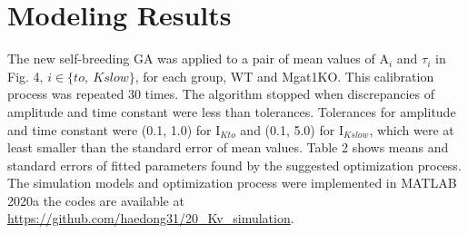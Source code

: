\documentclass[journal]{IEEEtran}
\begin{document}
\section{Modeling Results}
\begin{table}
    \caption{Fitted model parameters}
    \label{table2}
    \centering
\end{table}
The new self-breeding GA was applied to a pair of mean values of $\text{A}_i$ and $\tau_i$ in Fig. 4, $i \in \{to,\ Kslow\}$, for each group, WT and Mgat1KO. This calibration process was repeated 30 times. The algorithm stopped when discrepancies of amplitude and time constant were less than tolerances. Tolerances for amplitude and time constant were (0.1, 1.0) for $\text{I}_{Kto}$ and (0.1, 5.0) for $\text{I}_{Kslow}$, which were at least smaller than the standard error of mean values. Table 2 shows means and standard errors of fitted parameters found by the suggested optimization process. The simulation models and optimization process were implemented in MATLAB 2020a the codes are available at \url{https://github.com/haedong31/20_Kv_simulation}.
\end{document}
